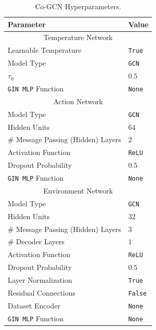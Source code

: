\documentclass{gdl}
\begin{document}
\begin{table}[h]
    \small\sf\centering
    \caption{Co-GCN Hyperparameters.}
    \begin{tabular}{ll}
        \toprule
        Parameter & Value \\
        \midrule
        \multicolumn{2}{c}{Temperature Network} \\
        \midrule
        Learnable Temperature & \texttt{True} \\
        Model Type & \texttt{GCN} \\
        $\tau_{0}$ & $0.5$ \\
        \texttt{GIN MLP} Function & \texttt{None} \\
        \midrule
        \multicolumn{2}{c}{Action Network} \\
        \midrule
        Model Type & \texttt{GCN} \\
        Hidden Units & $64$ \\
        \# Message Passing (Hidden) Layers & $2$ \\
        Activation Function & \texttt{ReLU} \\
        Dropout Probability & $0.5$ \\
        \texttt{GIN MLP} Function & \texttt{None} \\
        \midrule
        \multicolumn{2}{c}{Environment Network} \\
        \midrule
        Model Type & \texttt{GCN} \\
        Hidden Units & $32$ \\
        \# Message Passing (Hidden) Layers & $3$ \\
        \# Decoder Layers & $1$ \\
        Activation Function & \texttt{ReLU} \\
        Dropout Probability & $0.5$ \\
        Layer Normalization & \texttt{True} \\
        Residual Connections & \texttt{False} \\
        Dataset Encoder & \texttt{None} \\
        \texttt{GIN MLP} Function & \texttt{None} \\
        \bottomrule 
    \end{tabular}
    \label{tab:cognn-temp-params}
\end{table}
\end{document}

